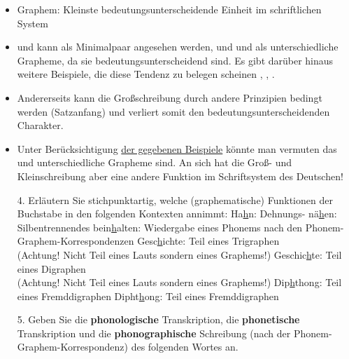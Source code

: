 {\begin{frame}[allowframebreaks]
\begin{itemize}
			\item Graphem: Kleinste bedeutungsunterscheidende Einheit im schriftlichen System
			\item {} und  kann als Minimalpaar angesehen werden, und  und  als unterschiedliche Grapheme, da sie bedeutungsunterscheidend sind. Es gibt darüber hinaus weitere Beispiele, die diese Tendenz zu belegen scheinen  \vs {},  \vs {},  \vs {}.
			\item Andererseits kann die Großschreibung durch andere Prinzipien bedingt werden (\zB Satzanfang) und verliert somit den bedeutungsunterscheidenden Charakter.
			\item Unter Berücksichtigung \underline{der gegebenen Beispiele} könnte man vermuten das  und  unterschiedliche Grapheme sind. An sich hat die Groß- und Kleinschreibung aber eine andere Funktion im Schriftsystem des Deutschen!
	\end{itemize}
\end{frame}


\begin{frame}

	\begin{itemize}
		\item[4.] Erläutern Sie stichpunktartig, welche (graphematische) Funktionen der Buchstabe  in den folgenden Kontexten annimmt:
		\eal
		\ex Ha\underline{h}n: \pause Dehnungs-
\pause
		\ex nä\underline{h}en: \pause Silbentrennendes 
\pause
		\ex bein\underline{h}alten: \pause Wiedergabe eines Phonems \textipa{[h]} nach den Phonem-Graphem-Korrespondenzen
\pause
		\ex Gesc\underline{h}ichte: \pause Teil eines Trigraphen \\(Achtung! Nicht Teil eines Lauts sondern eines Graphems!)
\pause
		\ex Geschic\underline{h}te: \pause Teil eines Digraphen \\(Achtung! Nicht Teil eines Lauts sondern eines Graphems!)
\pause
		\ex Dip\underline{h}thong: \pause Teil eines Fremddigraphen 
\pause
		\ex Dipht\underline{h}ong: \pause Teil eines Fremddigraphen 
		\zl
	\end{itemize}
\end{frame}


\begin{frame}

	\begin{itemize}
		\item[5.] Geben Sie die \textbf{phonologische} Transkription, die \textbf{phonetische} Transkription und die \textbf{phonographische} Schreibung (nach der Phonem-Graphem-Korrespondenz) des folgenden Wortes an.
		

\end{itemize}
\end{frame}}
